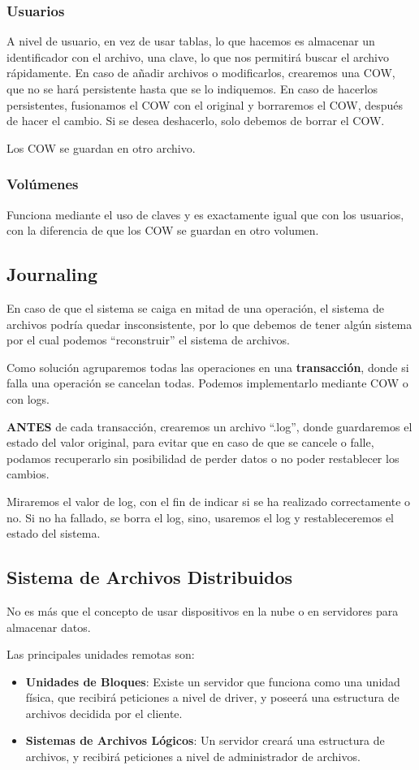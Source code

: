 \subsubsection{Usuarios}
\noindent A nivel de usuario, en vez de usar tablas, lo que hacemos es almacenar un identificador con el archivo, una clave, lo que nos permitirá buscar el archivo rápidamente. En caso de añadir archivos o modificarlos, crearemos una COW, que no se hará persistente hasta que se lo indiquemos. En caso de hacerlos persistentes, fusionamos el COW con el original y borraremos el COW, después de hacer el cambio. Si se desea deshacerlo, solo debemos de borrar el COW.
\par \noindent Los COW se guardan en otro archivo.
\subsubsection{Volúmenes}
\noindent Funciona mediante el uso de claves y es exactamente igual que con los usuarios, con la diferencia de que los COW se guardan en otro volumen.
\subsection{Journaling}
\noindent En caso de que el sistema se caiga en mitad de una operación, el sistema de archivos podría quedar insconsistente, por lo que debemos de tener algún sistema por el cual podemos ``reconstruir'' el sistema de archivos.
\par \noindent Como solución agruparemos todas las operaciones en una \textbf{transacción}, donde si falla una operación se cancelan todas. Podemos implementarlo mediante COW o con logs.
\vspace{.5cm}
\par \noindent \textbf{ANTES} de cada transacción, crearemos un archivo ``.log'', donde guardaremos el estado del valor original, para evitar que en caso de que se cancele o falle, podamos recuperarlo sin posibilidad de perder datos o no poder restablecer los cambios.
\par\noindent Miraremos el valor de log, con el fin de indicar si se ha realizado correctamente o no. Si no ha fallado, se borra el log, sino, usaremos el log y restableceremos el estado del sistema.
\subsection{Sistema de Archivos Distribuidos}
\noindent No es más que el concepto de usar dispositivos en la nube o en servidores para almacenar datos.
\par \noindent Las principales unidades remotas son:
\begin{itemize}
        \item \textbf{Unidades de Bloques}: Existe un servidor que funciona como una unidad física, que recibirá peticiones a nivel de driver, y poseerá una estructura de archivos decidida por el cliente.
        \item \textbf{Sistemas de Archivos Lógicos}: Un servidor creará una estructura de archivos, y recibirá peticiones a nivel de administrador de archivos.
\end{itemize}
